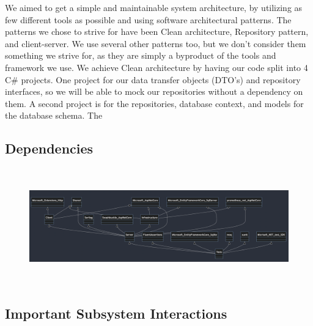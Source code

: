We aimed to get a simple and maintainable system architecture, by utilizing as few different tools as possible and using software architectural patterns. The patterns we chose to strive for have been Clean architecture, Repository pattern, and client-server. We use several other patterns too, but we don't consider them something we strive for, as they are simply a byproduct of the tools and framework we use. We achieve Clean architecture by having our code split into 4 C\# projects. One project for our data transfer objects (DTO's) and repository interfaces, so we will be able to mock our repositories without a dependency on them. A second project is for the repositories, database context, and models for the database schema. The 






\subsection{Dependencies}

\begin{figure}[H]
    \centering
    \includegraphics[width = 15.0cm, height = 5.0cm]{Images/dependencies2.png}
\end{figure}


\subsection{Important Subsystem Interactions}

